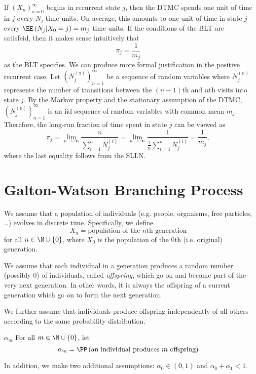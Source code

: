 \documentclass[stat333]{subfiles}
\begin{document}
    \clearpage
    \np If $\left( X_{n} \right)^{\infty}_{n=0}$ begins in recurrent state $j$, then the DTMC spends one unit of time in $j$ every $N_j$ time units. On average, this amounts to one unit of time in state $j$ every $\EE\left( N_j|X_0=j \right)=m_j$ time units. If the conditions of the BLT are satisfeid, then it makes sense intuitively that
    \begin{equation*}
        \pi_j = \frac{1}{m_j}
    \end{equation*}
    as the BLT specifies. We can produce more formal justification in the positive recurrent case. Let $\left( N_{j}^{\left( n \right)} \right)^{\infty}_{n=1}$ be a sequence of random variables where $N_j^{\left( n \right)}$ represents the number of transitions between the $\left( n-1 \right)$th and $n$th visits into state $j$. By the Markov property and the stationary assumption of the DTMC, $\left( N_{j}^{\left( n \right)} \right)^{\infty}_{n=1}$ is an iid sequence of random variables with common mean $m_j$. Therefore, the long-run fraction of time spent in state $j$ can be viewed as
    \begin{equation*}
        \pi_j = \lim_{n\to\infty} \frac{n}{\sum^{n}_{i=1}N_j^{\left( i \right)}} = \lim_{n\to\infty} \frac{1}{\frac{1}{n}\sum^{n}_{i=1}N_j^{\left( i \right)}} = \frac{1}{m_j},
    \end{equation*}
    where the last equality follows from the SLLN.

    \section{Galton-Watson Branching Process}

    \np We assume that a population of individuals (e.g. people, organisms, free particles, \ldots) evolves in discrete time. Specifically, we define
    \begin{equation*}
        X_n = \text{population of the $n$th generation}
    \end{equation*}
    for all $n\in\N\cup\left\lbrace 0 \right\rbrace$, where $X_0$ is the population of the $0$th (i.e. original) generation.

    We assume that each individual in a generation produces a random number (possibly $0$) of individuals, called \textit{offspring}, which go on and become part of the very next generation. In other words, it is always the offspring of a current generation which go on to form the next generation.

    We further assume that individuals produce offspring independently of all others according to the same probability distribution.
    \begin{notation}{$\alpha_m$}{}
        For all $m\in\N\cup\left\lbrace 0 \right\rbrace$, let
        \begin{equation*}
            \alpha_m = \PP\left( \text{an individual produces $m$ offspring} \right)
        \end{equation*}
    \end{notation}
    In addition, we make two additional assumptions: $\alpha_0\in\left( 0,1 \right)$ and $\alpha_0+\alpha_1<1$.
\end{document}
